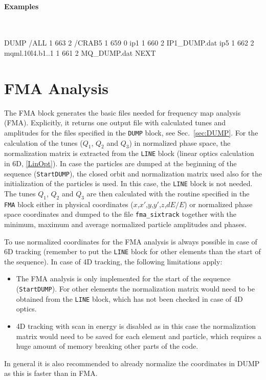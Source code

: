 \paragraph{Examples}~
\begin{cverbatim}
DUMP
/ALL 1 663 2
/CRAB5 1 659 0
ip1 1 660 2 IP1_DUMP.dat
ip5 1 662 2
mqml.10l4.b1..1 1 661 2 MQ_DUMP.dat
NEXT
\end{cverbatim}

\section{FMA Analysis} \label{sec:FMA}

The FMA block generates the basic files needed for frequency map analysis (FMA).
Explicitly, it returns one output file with calculated tunes and amplitudes for the files specified in the \texttt{DUMP} block, see Sec.~\ref{sec:DUMP}.
For the calculation of the tunes ($Q_1$, $Q_2$ and $Q_3$) in normalized phase space, the normalization matrix is extracted from the \texttt{LINE} block (linear optics calculation in 6D, \ref{LinOpt}).
In case the particles are dumped at the beginning of the sequence (\texttt{StartDUMP}), the closed orbit and normalization matrix used also for the initialization of the particles is used.
In this case, the \texttt{LINE} block is not needed.
The tunes $Q_1$, $Q_2$ and $Q_3$ are then calculated with the routine specified in the \texttt{FMA} block either in physical coordinates ($x$,$x'$,$y$,$y'$,$z$,$dE/E$) or normalized phase space coordinates and dumped to the file \texttt{fma\_sixtrack} together with the minimum, maximum and average normalized particle amplitudes and phases.

To use normalized coordinates for the FMA analysis is always possible in case of 6D tracking (remember to put the \texttt{LINE} block for other elements than the start of the sequence). In case of 4D tracking, the following limitations apply:
\begin{itemize}
    \item The FMA analysis is only implemented for the start of the sequence (\texttt{StartDUMP}). For other elements the normalization matrix would need to be obtained from the \texttt{LINE} block, which has not been checked in case of 4D optics.
    \item 4D tracking with scan in energy is disabled as in this case the normalization matrix would need to be saved for each element and particle, which requires a huge amount of memory breaking other parts of the code.	
\end{itemize}
In general it is also recommended to already normalize the coordinates in DUMP as this is faster than in FMA.


